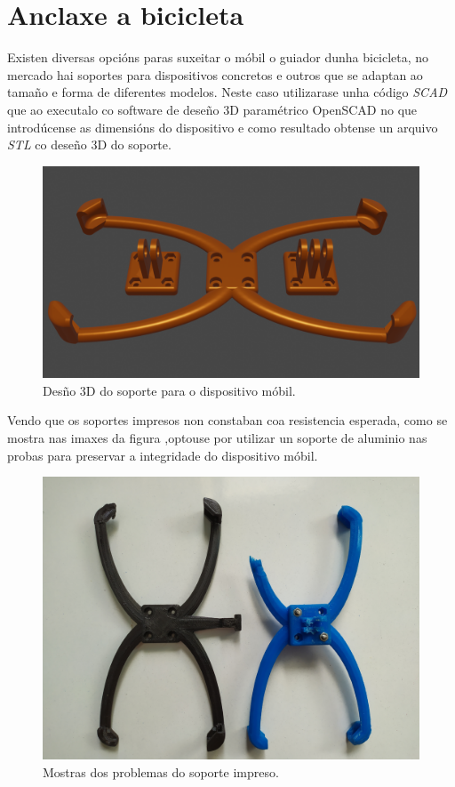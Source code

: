\section{Anclaxe a bicicleta}
Existen diversas opcións paras suxeitar o móbil o guiador dunha bicicleta, no mercado hai soportes para dispositivos concretos e outros que se adaptan ao tamaño e forma de diferentes modelos. Neste caso utilizarase unha código \emph{SCAD} que ao executalo co software de deseño 3D paramétrico OpenSCAD no que introdúcense as dimensións do dispositivo e como resultado obtense un arquivo \emph{STL} co deseño 3D do soporte.
\begin{figure}[tb]
  \centering
  \includegraphics[scale=.2]{imaxes/soporte-mobil.png}
  \caption{Desño 3D do soporte para o dispositivo móbil.}
  \label{f:soporte móbil}
\end{figure}
Vendo que os soportes impresos non constaban coa resistencia esperada, como se mostra nas imaxes da figura  ,optouse por utilizar un soporte de aluminio nas probas para preservar a integridade do dispositivo móbil.
\begin{figure}[tb]
  \centering
  \includegraphics[scale=.08]{imaxes/fallos-soporte.jpg}
  \caption{Mostras dos problemas do soporte impreso.}
  \label{f:soporte móbil}
\end{figure}
